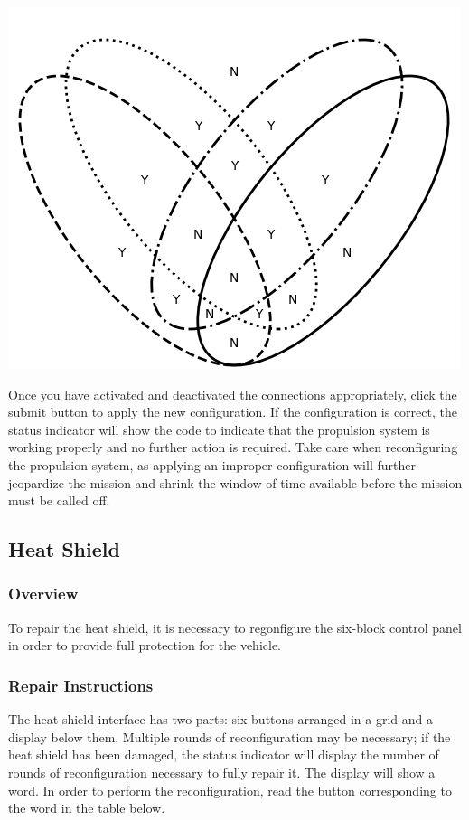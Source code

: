 \documentclass[12pt]{article}
\def\overview{\subsubsection*{Overview}}
\def\instruc{\subsubsection*{Repair Instructions}}
\newcommand{\status}[1]{\fbox{\texttt{#1}}}
\begin{document}
\begin{center}
\includegraphics{venn-diagram}
\end{center}

Once you have activated and deactivated the connections appropriately, click the submit button to apply the new configuration. If the configuration is correct, the status indicator will show the code \status{BB} to indicate that the propulsion system is working properly and no further action is required. Take care when reconfiguring the propulsion system, as applying an improper configuration will further jeopardize the mission and shrink the window of time available before the mission must be called off.

\subsection*{Heat Shield}

\overview

To repair the heat shield, it is necessary to regonfigure the six-block control panel in order to provide full protection for the vehicle.

\instruc

The heat shield interface has two parts: six buttons arranged in a grid and a display below them. Multiple rounds of reconfiguration may be necessary; if the heat shield has been damaged, the status indicator will display the number of rounds of reconfiguration necessary to fully repair it. The display will show a word. In order to perform the reconfiguration, read the button corresponding to the word in the table below.
\end{document}
